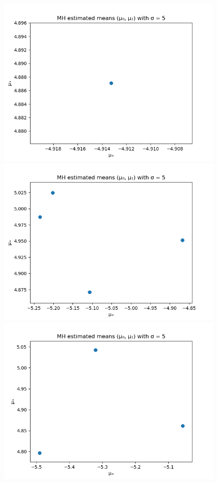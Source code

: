 \begin{figure}
	\centering
	\includegraphics[scale=0.5]{mh-estimated-means-with-sigma-5-1.png}
	\includegraphics[scale=0.5]{mh-estimated-means-with-sigma-5-2.png}
	\includegraphics[scale=0.5]{mh-estimated-means-with-sigma-5-3.png}

\end{figure}
